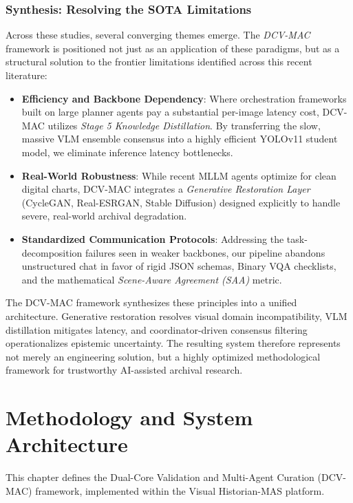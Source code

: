 \documentclass[12pt,a4paper]{report}
\begin{document}
\subsection{Synthesis: Resolving the SOTA Limitations}
Across these studies, several converging themes emerge. The \textit{DCV-MAC} framework is positioned not just as an application of these paradigms, but as a structural solution to the frontier limitations identified across this recent literature:

\begin{itemize}
    \item \textbf{Efficiency and Backbone Dependency}: Where orchestration frameworks built on large planner agents pay a substantial per-image latency cost, DCV-MAC utilizes \textit{Stage 5 Knowledge Distillation}. By transferring the slow, massive VLM ensemble consensus into a highly efficient YOLOv11 student model, we eliminate inference latency bottlenecks.
    \item \textbf{Real-World Robustness}: While recent MLLM agents optimize for clean digital charts, DCV-MAC integrates a \textit{Generative Restoration Layer} (CycleGAN, Real-ESRGAN, Stable Diffusion) designed explicitly to handle severe, real-world archival degradation.
    \item \textbf{Standardized Communication Protocols}: Addressing the task-decomposition failures seen in weaker backbones, our pipeline abandons unstructured chat in favor of rigid JSON schemas, Binary VQA checklists, and the mathematical \textit{Scene-Aware Agreement (SAA)} metric.
\end{itemize}

The DCV-MAC framework synthesizes these principles into a unified architecture. Generative restoration resolves visual domain incompatibility, VLM distillation mitigates latency, and coordinator-driven consensus filtering operationalizes epistemic uncertainty. The resulting system therefore represents not merely an engineering solution, but a highly optimized methodological framework for trustworthy AI-assisted archival research.

\chapter{Methodology and System Architecture}
\label{ch:methodology}

This chapter defines the Dual-Core Validation and Multi-Agent Curation (DCV-MAC) framework, implemented within the Visual Historian-MAS platform.
\end{document}
